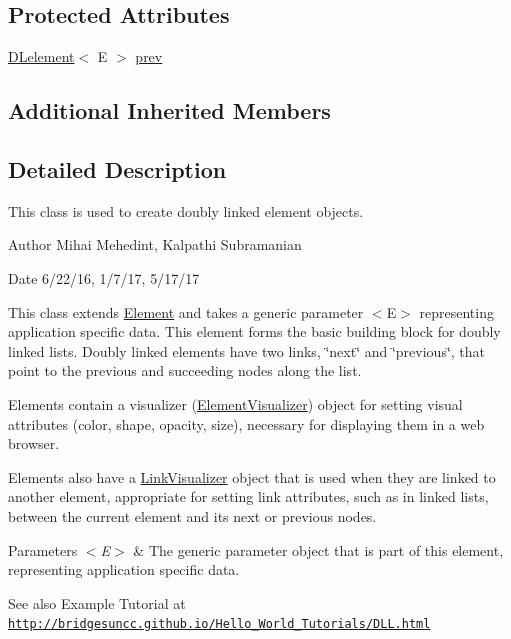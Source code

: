 \subsection*{Protected Attributes}
\begin{DoxyCompactItemize}
\item 
\mbox{\hyperlink{classbridges_1_1base_1_1_d_lelement}{D\+Lelement}}$<$ E $>$ \mbox{\hyperlink{classbridges_1_1base_1_1_d_lelement_a6eba4876f820b75ac6bde01d7dea9da7}{prev}}
\end{DoxyCompactItemize}
\subsection*{Additional Inherited Members}


\subsection{Detailed Description}
This class is used to create doubly linked element objects. 

\begin{DoxyAuthor}{Author}
Mihai Mehedint, Kalpathi Subramanian
\end{DoxyAuthor}
\begin{DoxyDate}{Date}
6/22/16, 1/7/17, 5/17/17
\end{DoxyDate}
This class extends \mbox{\hyperlink{classbridges_1_1base_1_1_element}{Element}} and takes a generic parameter $<$\+E$>$ representing application specific data. This element forms the basic building block for doubly linked lists. Doubly linked elements have two links, \char`\"{}next\char`\"{} and \char`\"{}previous\char`\"{}, that point to the previous and succeeding nodes along the list.

Elements contain a visualizer (\mbox{\hyperlink{classbridges_1_1base_1_1_element_visualizer}{Element\+Visualizer}}) object for setting visual attributes (color, shape, opacity, size), necessary for displaying them in a web browser.

Elements also have a \mbox{\hyperlink{classbridges_1_1base_1_1_link_visualizer}{Link\+Visualizer}} object that is used when they are linked to another element, appropriate for setting link attributes, such as in linked lists, between the current element and its next or previous nodes.


\begin{DoxyParams}{Parameters}
{\em $<$\+E$>$} & The generic parameter object that is part of this element, representing application specific data.\\
\hline
\end{DoxyParams}
\begin{DoxySeeAlso}{See also}
Example Tutorial at ~\newline
 \href{http://bridgesuncc.github.io/Hello_World_Tutorials/DLL.html}{\tt http\+://bridgesuncc.\+github.\+io/\+Hello\+\_\+\+World\+\_\+\+Tutorials/\+D\+L\+L.\+html} 
\end{DoxySeeAlso}



